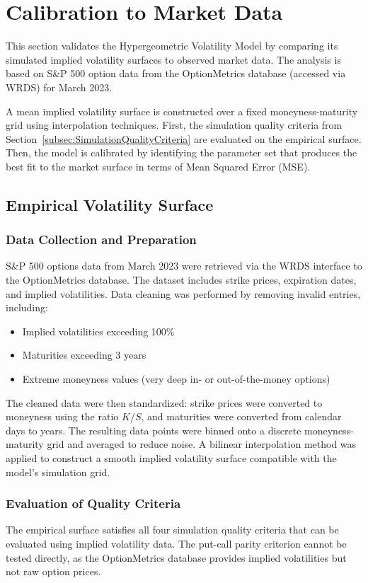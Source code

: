 \section{Calibration to Market Data} \label{sec:Calibration}

This section validates the Hypergeometric Volatility Model by comparing its simulated implied volatility surfaces to observed market data. The analysis is based on S\&P 500 option data from the OptionMetrics database (accessed via WRDS) for March 2023. 

A mean implied volatility surface is constructed over a fixed moneyness-maturity grid using interpolation techniques. First, the simulation quality criteria from Section~\ref{subsec:SimulationQualityCriteria} are evaluated on the empirical surface. Then, the model is calibrated by identifying the parameter set that produces the best fit to the market surface in terms of Mean Squared Error (MSE).

\subsection{Empirical Volatility Surface}

\subsubsection*{Data Collection and Preparation}
S\&P 500 options data from March 2023 were retrieved via the WRDS interface to the OptionMetrics database. The dataset includes strike prices, expiration dates, and implied volatilities. Data cleaning was performed by removing invalid entries, including:
\begin{itemize}
    \item Implied volatilities exceeding 100\%
    \item Maturities exceeding 3 years
    \item Extreme moneyness values (very deep in- or out-of-the-money options)
\end{itemize}

The cleaned data were then standardized: strike prices were converted to moneyness using the ratio $K/S$, and maturities were converted from calendar days to years. The resulting data points were binned onto a discrete moneyness-maturity grid and averaged to reduce noise. A bilinear interpolation method was applied to construct a smooth implied volatility surface compatible with the model's simulation grid.

\subsubsection*{Evaluation of Quality Criteria}
The empirical surface satisfies all four simulation quality criteria that can be evaluated using implied volatility data. The put-call parity criterion cannot be tested directly, as the OptionMetrics database provides implied volatilities but not raw option prices. 

